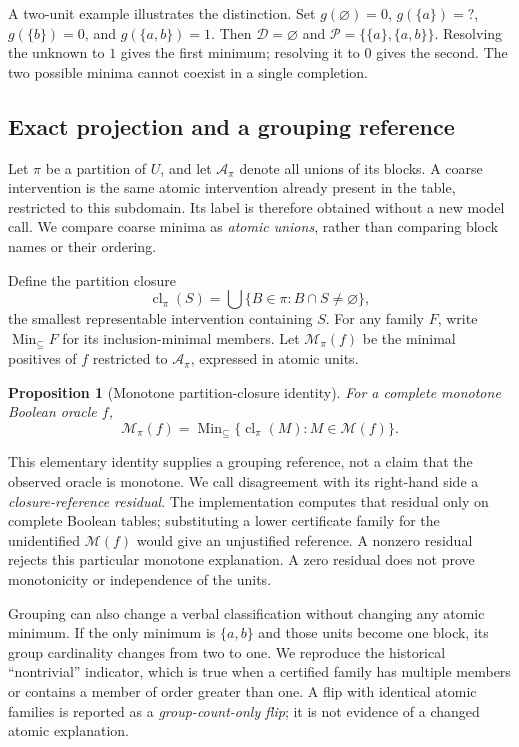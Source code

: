 \documentclass{article}
\newtheorem{proposition}{Proposition}
\newcommand{\Fam}{\mathcal{M}}
\newcommand{\Nec}{\mathcal{D}}
\newcommand{\Poss}{\mathcal{P}}
\newcommand{\Representable}{\mathcal{A}}
\newcommand{\cl}{\operatorname{cl}}
\newcommand{\mininc}{\operatorname{Min}_{\subseteq}}
\newcommand{\unknown}{\mathord{?}}
\begin{document}
A two-unit example illustrates the distinction. Set $g(\varnothing)=0$,
$g(\{a\})=\unknown$, $g(\{b\})=0$, and $g(\{a,b\})=1$. Then
$\Nec=\varnothing$ and $\Poss=\{\{a\},\{a,b\}\}$. Resolving the unknown
to $1$ gives the first minimum; resolving it to $0$ gives the second. The two
possible minima cannot coexist in a single completion.

\subsection{Exact projection and a grouping reference}

Let $\pi$ be a partition of $U$, and let $\Representable_\pi$ denote all
unions of its blocks. A coarse intervention is the same atomic intervention
already present in the table, restricted to this subdomain. Its label is
therefore obtained without a new model call. We compare coarse minima as
\emph{atomic unions}, rather than comparing block names or their ordering.

Define the partition closure
\begin{equation}
\cl_\pi(S)=\bigcup\{B\in\pi:B\cap S\ne\varnothing\},
\end{equation}
the smallest representable intervention containing $S$. For any family $F$,
write $\mininc F$ for its inclusion-minimal members. Let $\Fam_\pi(f)$ be
the minimal positives of $f$ restricted to $\Representable_\pi$, expressed
in atomic units.

\begin{proposition}[Monotone partition-closure identity]
\label{prop:closure}
For a complete monotone Boolean oracle $f$,
\begin{equation}
\Fam_\pi(f)=\mininc\{\cl_\pi(M):M\in\Fam(f)\}.
\label{eq:closure}
\end{equation}
\end{proposition}

This elementary identity supplies a grouping reference, not a claim that the
observed oracle is monotone. We call disagreement with its right-hand side a
\emph{closure-reference residual}. The implementation computes that residual
only on complete Boolean tables; substituting a lower certificate family for
the unidentified $\Fam(f)$ would give an unjustified reference. A nonzero
residual rejects this particular monotone explanation. A zero residual does
not prove monotonicity or independence of the units.

Grouping can also change a verbal classification without changing any atomic
minimum. If the only minimum is $\{a,b\}$ and those units become one block,
its group cardinality changes from two to one. We reproduce the historical
``nontrivial'' indicator, which is true when a certified family has multiple
members or contains a member of order greater than one. A flip with identical
atomic families is reported as a \emph{group-count-only flip}; it is not
evidence of a changed atomic explanation.
\end{document}
